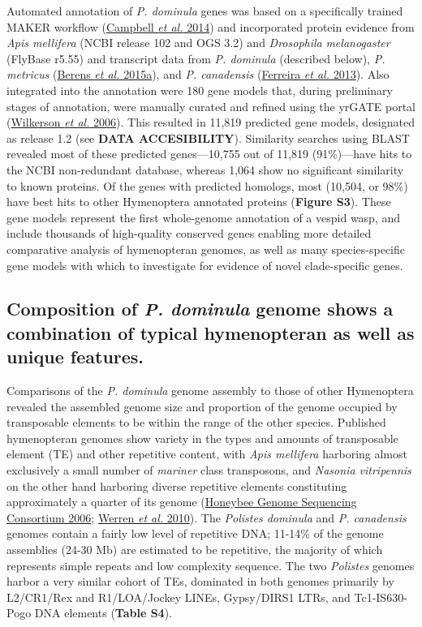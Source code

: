 Automated annotation of \textit{P. dominula} genes was based on a
specifically trained MAKER workflow
(\protect\hyperlink{ux5fENREFux5f6}{Campbell \textit{et al.} 2014}) and
incorporated protein evidence from \textit{Apis mellifera} (NCBI release
102 and OGS 3.2) and \textit{Drosophila} \textit{melanogaster} (FlyBase
r5.55) and transcript data from \textit{P. dominula} (described below),
\textit{P. metricus} (\protect\hyperlink{ux5fENREFux5f2}{Berens \textit{et
al.} 2015a}), and \textit{P. canadensis}
(\protect\hyperlink{ux5fENREFux5f10}{Ferreira \textit{et al.} 2013}). Also
integrated into the annotation were 180 gene models that, during
preliminary stages of annotation, were manually curated and refined
using the yrGATE portal (\protect\hyperlink{ux5fENREFux5f73}{Wilkerson
\textit{et al.} 2006}). This resulted in 11,819 predicted gene models,
designated as release 1.2 (see \textbf{DATA ACCESIBILITY}). Similarity
searches using BLAST revealed most of these predicted genes---10,755 out
of 11,819 (91\%)---have hits to the NCBI non-redundant database, whereas
1,064 show no significant similarity to known proteins. Of the genes
with predicted homologs, most (10,504, or 98\%) have best hits to other
Hymenoptera annotated proteins (\textbf{Figure S3}). These gene models
represent the first whole-genome annotation of a vespid wasp, and
include thousands of high-quality conserved genes enabling more detailed
comparative analysis of hymenopteran genomes, as well as many
species-specific gene models with which to investigate for evidence of
novel clade-specific genes.

\subsection{Composition of \textit{P. dominula} genome shows a combination of
typical hymenopteran as well as unique features.} Comparisons of the
\textit{P. dominula} genome assembly to those of other Hymenoptera
revealed the assembled genome size and proportion of the genome occupied
by transposable elements to be within the range of the other species.
Published hymenopteran genomes show variety in the types and amounts of
transposable element (TE) and other repetitive content, with \textit{Apis
mellifera} harboring almost exclusively a small number of \textit{mariner}
class transposons, and \textit{Nasonia vitripennis} on the other hand
harboring diverse repetitive elements constituting approximately a
quarter of its genome (\protect\hyperlink{ux5fENREFux5f20}{Honeybee
Genome Sequencing Consortium 2006};
\protect\hyperlink{ux5fENREFux5f70}{Werren \textit{et al.} 2010}). The
\textit{Polistes dominula} and \textit{P. canadensis} genomes contain a
fairly low level of repetitive DNA; 11-14\% of the genome assemblies
(24-30 Mb) are estimated to be repetitive, the majority of which
represents simple repeats and low complexity sequence. The two
\textit{Polistes} genomes harbor a very similar cohort of TEs, dominated
in both genomes primarily by L2/CR1/Rex and R1/LOA/Jockey LINEs,
Gypsy/DIRS1 LTRs, and Tc1-IS630-Pogo DNA elements (\textbf{Table S4}).

